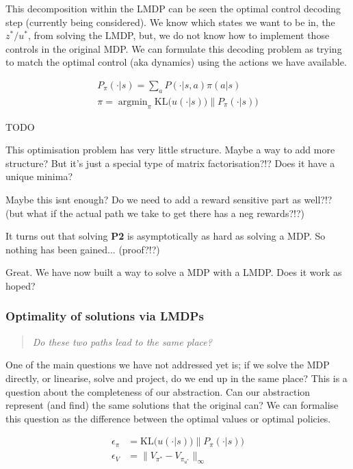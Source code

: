 This decomposition within the LMDP can be seen the optimal control decoding
step (currently being considered). We know which
states we want to be in, the $z^{* } / u^{* }$, from solving the LMDP, but,
we do not know how to implement those controls in the original MDP.
We can formulate this decoding problem as trying to match the optimal control (aka dynamics)
using the actions we have available.

\begin{align}
P_{\pi}(\cdot | s) = \sum_a P(\cdot | s, a) \pi(a | s) \\
\pi = \mathop{\text{argmin}}_{\pi} \text{KL}\Big(u(\cdot | s))\parallel P_{\pi}(\cdot | s)\Big)
\end{align}

{\color{red}TODO}

This optimisation problem has very little structure.
Maybe a way to add more structure?
But it's just a special type of matrix factorisation?!? Does it have a unique minima?

Maybe this isnt enough? Do we need to add a reward sensitive part as
well?!? (but what if the actual path we take to get there has a neg
rewards?!?)

It turns out that solving \textbf{P2} is asymptotically as hard as solving a MDP.
So nothing has been gained... (proof?!?)

Great. We have now built a way to solve a MDP with a LMDP. Does it work as hoped?

\subsubsection{Optimality of solutions via LMDPs}

\begin{quote}
\textit{Do these two paths lead to the same place?}
\end{quote}

One of the main questions we have not addressed yet is; if we solve the
MDP directly, or linearise, solve and project, do we end up in the same
place? This is a question about the completeness of our abstraction. Can
our abstraction represent (and find) the same solutions that the
original can? We can formalise this question as the difference between the optimal values or optimal policies.

\begin{align*}
\epsilon_{\pi} &= \text{KL}\Big(u(\cdot | s))\parallel P_{\pi}(\cdot | s)\Big) \\
\epsilon_{V} &= \parallel V_{\pi^{* }} - V_{\pi_{u^{* }}} \parallel_{\infty}
\end{align*}

